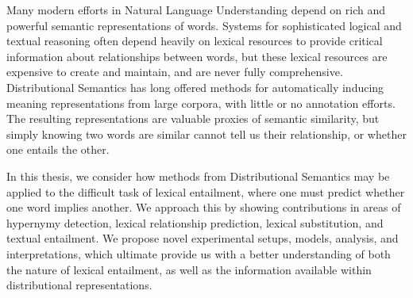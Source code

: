 Many modern efforts in Natural Language Understanding depend on rich and
powerful semantic representations of words. Systems for sophisticated logical
and textual reasoning often depend heavily on
lexical resources to provide critical information about relationships
between words, but these lexical resources are expensive to create and
maintain, and are never fully comprehensive. Distributional Semantics has
long offered methods for automatically inducing meaning representations from
large corpora, with little or no annotation efforts. The resulting
representations are valuable proxies of semantic similarity, but simply knowing
two words are similar cannot tell us their relationship, or whether one
entails the other.

In this thesis, we consider how methods from Distributional Semantics may be
applied to the difficult task of lexical entailment, where one must predict whether
one word implies another. We approach this by
showing contributions in areas of hypernymy detection, lexical relationship
prediction, lexical substitution, and textual entailment. We propose novel
experimental setups, models, analysis, and interpretations, which ultimate
provide us with a better understanding of both the nature of lexical entailment,
as well as the information available within distributional representations.



